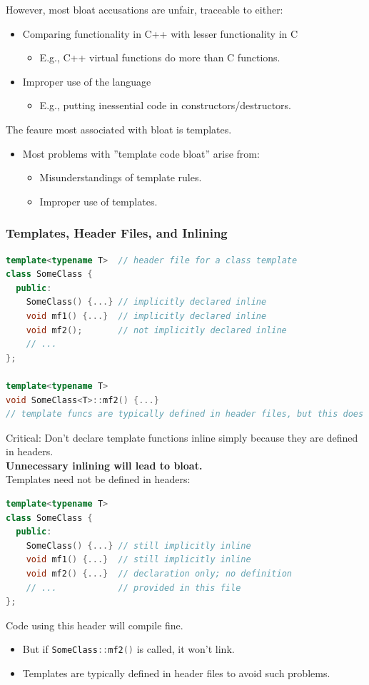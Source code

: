 However, most bloat accusations are unfair, traceable to either:
\begin{itemize}
  \item Comparing functionality in C++ with lesser functionality in C
  \begin{itemize}
    \item E.g., C++ virtual functions do more than C functions.
  \end{itemize}
  \item Improper use of the language
  \begin{itemize}
    \item E.g., putting inessential code in constructors/destructors.
  \end{itemize}
\end{itemize}
The feaure most associated with bloat is templates.
\begin{itemize}
  \item Most problems with ''template code bloat'' arise from:
  \begin{itemize}
    \item Misunderstandings of template rules.
    \item Improper use of templates.
  \end{itemize}
\end{itemize}

\subsubsection{Templates, Header Files, and Inlining}
\begin{lstlisting}[language=C++]
template<typename T>  // header file for a class template
class SomeClass {
  public:
    SomeClass() {...} // implicitly declared inline
    void mf1() {...}  // implicitly declared inline
    void mf2();       // not implicitly declared inline
    // ...
};

template<typename T>
void SomeClass<T>::mf2() {...}
// template funcs are typically defined in header files, but this does not automatically declare them inline
\end{lstlisting}
Critical: Don't declare template functions inline simply because they are defined in headers.\\
\textbf{Unnecessary inlining will lead to bloat.}\\

Templates need not be defined in headers:
\begin{lstlisting}[language=C++]
template<typename T>
class SomeClass {
  public:
    SomeClass() {...} // still implicitly inline
    void mf1() {...}  // still implicitly inline
    void mf2() {...}  // declaration only; no definition
    // ...            // provided in this file
};
\end{lstlisting}
Code using this header will compile fine.
\begin{itemize}
  \item But if \lstinline[language=C++]{SomeClass::mf2()} is called, it won't link.
  \item Templates are typically defined in header files to avoid such problems.
\end{itemize}

